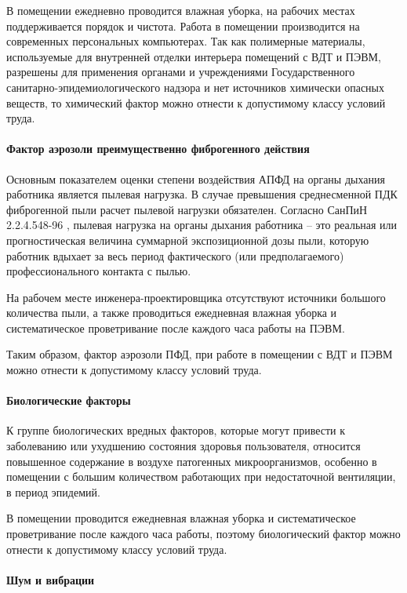 В помещении ежедневно проводится влажная уборка, на рабочих местах поддерживается
порядок и чистота. Работа в помещении производится на современных персональных
компьютерах. Так как полимерные материалы, используемые для внутренней отделки
интерьера помещений с ВДТ и ПЭВМ, разрешены для применения органами и учреждениями
Государственного санитарно-эпидемиологического надзора и нет источников химически
опасных веществ, то химический фактор можно отнести к допустимому классу условий
труда.

\paragraph{Фактор аэрозоли преимущественно фиброгенного действия}

Основным показателем оценки степени воздействия АПФД на органы дыхания работника
является пылевая нагрузка. В случае превышения среднесменной ПДК фиброгенной пыли
расчет пылевой нагрузки обязателен. Согласно СанПиН 2.2.4.548-96
\cite{ecology_sanpin_548_96}, пылевая нагрузка на органы дыхания работника – это
реальная или прогностическая величина суммарной экспозиционной дозы пыли, которую
работник вдыхает за весь период фактического (или предполагаемого) профессионального
контакта с пылью.

На рабочем месте инженера-проектировщика отсутствуют источники большого количества
пыли, а также проводиться ежедневная влажная уборка и систематическое проветривание
после каждого часа работы на ПЭВМ.

Таким образом, фактор аэрозоли ПФД, при работе в помещении с ВДТ и ПЭВМ можно
отнести к допустимому классу условий труда.

\paragraph{Биологические факторы}

К группе биологических вредных факторов, которые могут привести к заболеванию
или ухудшению состояния здоровья пользователя, относится повышенное содержание
в воздухе патогенных микроорганизмов, особенно в помещении с большим количеством
работающих при недостаточной вентиляции, в период эпидемий.

В помещении проводится ежедневная влажная уборка и систематическое проветривание
после каждого часа работы, поэтому биологический фактор можно отнести к допустимому
классу условий труда.

\paragraph{Шум и вибрации}

